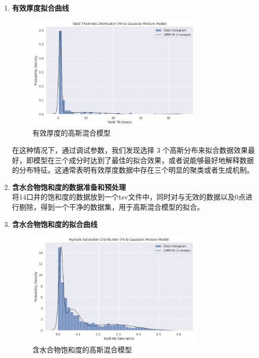 \documentclass[12pt,a4paper]{nmmcm}
\begin{document}
\begin{enumerate}
  \item \textbf{有效厚度拟合曲线} \\
        \begin{figure}[H]
          \centering
          \includegraphics[width=0.8\textwidth]{figures/task2/task2-1.png}
          \caption{有效厚度的高斯混合模型}
        \end{figure}
        在这种情况下，通过调试参数，我们发现选择 3 个高斯分布来拟合数据效果最好，即模型在三个成分时达到了最佳的拟合效果，或者说能够最好地解释数据的分布特征。这通常表明有效厚度数据中存在三个明显的聚类或者生成机制。
  \item \textbf{含水合物饱和度的数据准备和预处理} \\
        将14口井的饱和度的数据放到一个tsv文件中，同时对与无效的数据以及0点进行剔除，得到一个干净的数据集，用于高斯混合模型的拟合。

  \item \textbf{含水合物饱和度的拟合曲线} \\
        \begin{figure}[H]
          \centering
          \includegraphics[width=0.8\textwidth]{figures/task2/task2-3.png}
          \caption{含水合物饱和度的高斯混合模型}
        \end{figure}




\end{enumerate}
\end{document}
